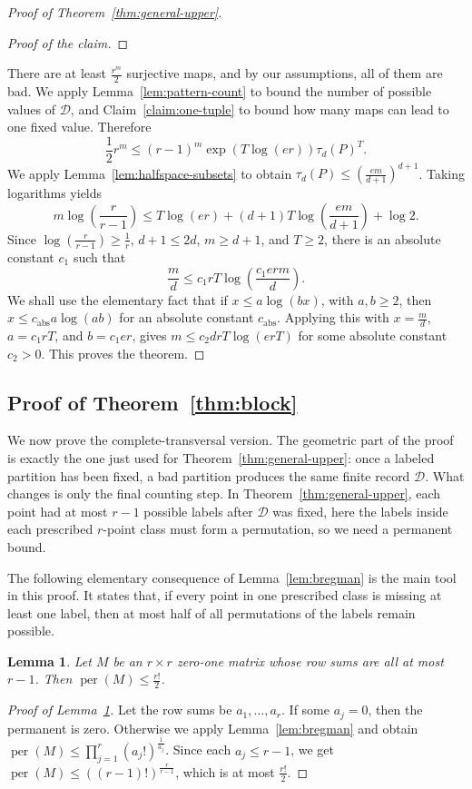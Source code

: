 \documentclass[11pt]{article}
\newtheorem{lemma}[theorem]{Lemma}
\theoremstyle{definition}
\newenvironment{poc}{\begin{proof}[Proof of the claim]\renewcommand*{\qedsymbol}{\(\blacksquare\)}}{\end{proof}}
\begin{document}
\begin{proof}[Proof of Theorem~\ref{thm:general-upper}]
\begin{poc}
\end{poc}
There are at least \(\frac{r^{m}}{2}\) surjective maps, and by our assumptions, all of them are bad. We apply Lemma~\ref{lem:pattern-count} to bound the number of possible values of \(\mathcal{D}\), and Claim~\ref{claim:one-tuple} to bound how many maps can lead to one fixed value. Therefore
\[
\frac{1}{2}r^{m}\le (r-1)^{m}\exp(T\log(er))\tau_{d}(P)^{T}.
\]
We apply Lemma~\ref{lem:halfspace-subsets} to obtain \(\tau_{d}(P)\le \left(\frac{em}{d+1}\right)^{d+1}\). Taking logarithms yields
\[
m\log\left(\frac{r}{r-1}\right)\le T\log(er)+(d+1)T\log\left(\frac{em}{d+1}\right)+\log 2.
\]
Since \(\log\left(\frac{r}{r-1}\right)\ge \frac{1}{r}\), \(d+1\le 2d\), \(m\ge d+1\), and \(T\ge 2\), there is an absolute constant \(c_{1}\) such that
\[
\frac{m}{d}\le c_{1}rT\log\left(\frac{c_{1}erm}{d}\right).
\]
We shall use the elementary fact that if \(x\le a\log(bx)\), with
\(a,b\ge 2\), then \(x\le c_{\mathrm{abs}}a\log(ab)\) for an absolute constant \(c_{\mathrm{abs}}\).
Applying this with \(x=\frac{m}{d}\), \(a=c_{1}rT\), and \(b=c_{1}er\), gives 
\(m\le c_{2}drT\log(erT)\) for some absolute constant \(c_{2}>0\). This proves the theorem.


\end{proof}

\subsection{Proof of Theorem~\ref{thm:block}}
We now prove the complete-transversal version. The geometric part of the proof is exactly the one just used for Theorem~\ref{thm:general-upper}: once a labeled partition has been fixed, a bad partition produces the same finite record \(\mathcal{D}\). What changes is only the final counting step. In Theorem~\ref{thm:general-upper}, each point had at most \(r-1\) possible labels after \(\mathcal{D}\) was fixed, here the labels inside each prescribed \(r\)-point class must form a permutation, so we need a permanent bound.

The following elementary consequence of Lemma~\ref{lem:bregman} is the main tool in this proof. It states that, if every point in one prescribed class is missing at least one label, then at most half of all permutations of the labels remain possible.
\begin{lemma}\label{lem:permanent}
Let \(M\) be an \(r\times r\) zero-one matrix whose row sums are all at most \(r-1\). Then \(\operatorname{per}(M)\le \frac{r!}{2}\).
\end{lemma}
\begin{proof}[Proof of Lemma~\ref{lem:permanent}]
Let the row sums be \(a_{1},\ldots,a_{r}\). If some \(a_{j}=0\), then the permanent is zero. Otherwise we apply Lemma~\ref{lem:bregman} and obtain \(\operatorname{per}(M)\le \prod_{j=1}^{r}(a_{j}!)^{\frac{1}{a_{j}}}\). Since each \(a_{j}\le r-1\), we get \(\operatorname{per}(M)\le ((r-1)!)^{\frac{r}{r-1}}\), which is at most \(\frac{r!}{2}\).
\end{proof}
\end{document}
